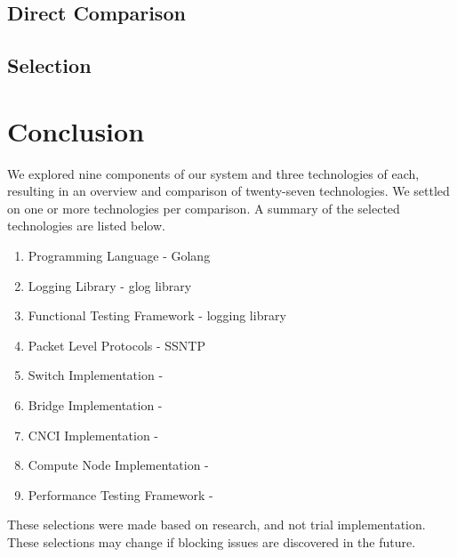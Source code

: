 \documentclass[10pt,letterpaper,onecolumn,draftclsnofoot]{IEEEtran}
\begin{document}
\subsection{Direct Comparison}

\subsection{Selection}

\section{Conclusion}

We explored nine components of our system and three technologies of each,
resulting in an overview and comparison of twenty-seven technologies. We settled
on one or more technologies per comparison. A summary of the selected
technologies are listed below.

\begin{enumerate}
	\item Programming Language - Golang
	\item Logging Library - glog library
	\item Functional Testing Framework - logging library
	\item Packet Level Protocols - SSNTP
	\item Switch Implementation -
	\item Bridge Implementation -
	\item CNCI Implementation -
	\item Compute Node Implementation -
	\item Performance Testing Framework -
\end{enumerate}

These selections were made based on research, and not trial implementation.
These selections may change if blocking issues are discovered in the future.



\end{document}
